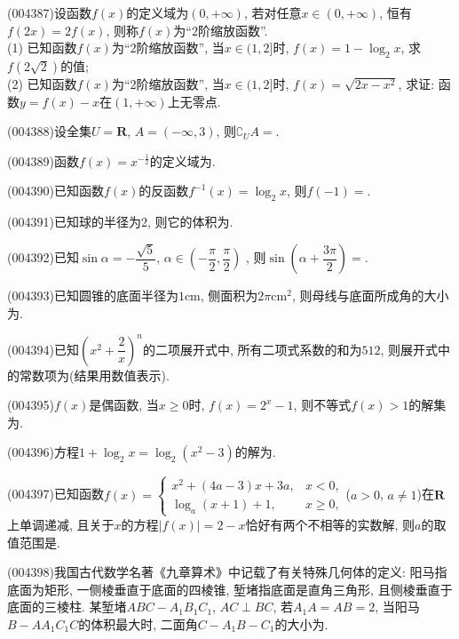 \item (004387)设函数$f(x)$的定义域为$(0,+\infty)$, 若对任意$x\in (0,+\infty)$, 恒有$f(2x)=2f(x)$, 则称$f(x)$为``$2$阶缩放函数''.\\
(1) 已知函数$f(x)$为``$2$阶缩放函数'', 当$x\in (1,2]$时, $f(x)=1-\log_2 x$, 求$f(2\sqrt{2})$的值;\\
(2) 已知函数$f(x)$为``$2$阶缩放函数'', 当$x\in (1,2]$时, $f(x)=\sqrt{2x-x^2}$, 求证: 函数$y=f(x)-x$在$(1,+\infty)$上无零点.
\item (004388)设全集$U=\mathbf{R}$, $A=(-\infty ,3)$, 则$\complement_UA=$.
\item (004389)函数$f(x)=x^{- \frac 12}$的定义域为.
\item (004390)已知函数$f(x)$的反函数$f^{-1}(x)=\log_2x$, 则$f(-1)=$.
\item (004391)已知球的半径为$2$, 则它的体积为.
\item (004392)已知$\sin \alpha =-\dfrac{\sqrt 5}5$, $\alpha \in (-\dfrac{\pi}2,\dfrac{\pi}2)$ , 则$\sin (\alpha +\dfrac{3\pi}2)=$.
\item (004393)已知圆锥的底面半径为$1\text{cm}$, 侧面积为$2\pi\text{cm}^2$, 则母线与底面所成角的大小为.
\item (004394)已知$(x^2+\dfrac 2x)^n$的二项展开式中, 所有二项式系数的和为$512$, 则展开式中的常数项为(结果用数值表示).
\item (004395)$f(x)$是偶函数, 当$x\ge 0$时, $f(x)=2^x-1$, 则不等式$f(x)>1$的解集为.
\item (004396)方程$1+\log_2x=\log_2(x^2-3)$的解为.
\item (004397)已知函数$f(x)=\begin{cases}  x^2+(4a-3)x+3a,& x<0, \\ \log_a(x+1)+1,& x\ge 0, \end{cases}$($a>0$, $a\ne 1$)在$\mathbf{R}$上单调递减, 且关于$x$的方程$|f(x)|=2-x$恰好有两个不相等的实数解, 则$a$的取值范围是.
\item (004398)我国古代数学名著《九章算术》中记载了有关特殊几何体的定义: 阳马指底面为矩形, 一侧棱垂直于底面的四棱锥, 堑堵指底面是直角三角形, 且侧棱垂直于底面的三棱柱. 某堑堵$ABC-A_1B_1C_1$, $AC\perp BC$, 若$A_1A=AB=2$, 当阳马$B-AA_1C_1C$的体积最大时, 二面角$C-A_1B-C_1$的大小为.
\begin{center}
\end{center}
